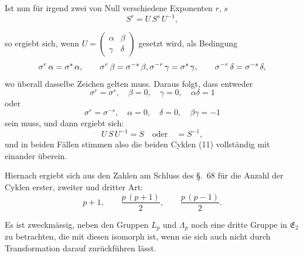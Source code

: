 \documentclass[12pt,a4paper]{article}
\begin{document}
Ist nun für irgend zwei von Null verschiedene Exponenten $r$, $s$
\[
S^{r} = U\,S^{s}\,U^{-1},
\]

\newpage
{}

so ergiebt sich, wenn $U = \begin{pmatrix}\alpha&\beta\\\gamma&\delta\end{pmatrix}$ gesetzt wird, als Bedingung
\[
\sigma^{r}\,\alpha = \sigma^{s}\,\alpha,\qquad
\sigma^{r}\,\beta = \sigma^{-s}\,\beta,\\
\sigma^{-r}\,\gamma = \sigma^{s}\,\gamma,\qquad
\sigma^{-r}\,\delta = \sigma^{-s}\,\delta,
\]
wo überall dasselbe Zeichen gelten muss. Daraus folgt, dass entweder
\[
\sigma^{r} = \sigma^{s},\quad \beta = 0,\quad \gamma = 0,\quad \alpha\delta = 1
\]
oder
\[
\sigma^{r} = \sigma^{-s},\quad \alpha = 0,\quad \delta = 0,\quad \beta\gamma = -1
\]
sein muss, und dann ergiebt sich:
\[
U\,S\,U^{-1} = S\quad\text{oder}\quad = S^{-1},
\]
und in beiden Fällen stimmen also die beiden Cyklen (11) vollständig mit einander überein.

Hiernach ergiebt sich aus den Zahlen am Schluss des \S.~68 für die Anzahl der Cyklen erster, zweiter und dritter Art:
\[
p + 1,\qquad \frac{p\,(p+1)}{2},\qquad \frac{p\,(p-1)}{2}.
\]

Es ist zweckmässig, neben den Gruppen $L_{p}$ und $\varLambda_{p}$ noch eine dritte Gruppe in $\mathfrak{E}_{2}$ zu betrachten, die mit diesen isomorph ist, wenn sie sich auch nicht durch Transformation darauf zurückführen lässt.
\end{document}

